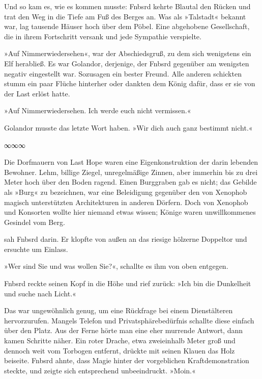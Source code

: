 Und so kam es, wie es kommen musste: Fnbsrd kehrte Blautal den Rücken und trat den Weg in die Tiefe am Fuß des Berges an. Was als »Talstadt« bekannt war, lag tausende Häuser hoch über dem Pöbel. Eine abgehobene Gesellschaft, die in ihrem Fortschritt versank und jede Sympathie verspielte.

»Auf Nimmerwiedersehen«, war der Abschiedsgruß, zu dem sich wenigstens ein Elf herabließ. Es war Golandor, derjenige, der Fnbsrd gegenüber am wenigsten negativ eingestellt war. Sozusagen ein bester Freund. Alle anderen schickten stumm ein paar Flüche hinterher oder dankten dem König dafür, dass er sie von der Last erlöst hatte.

»Auf Nimmerwiedersehen. Ich werde euch nicht vermissen.«

Golandor musste das letzte Wort haben. »Wir dich auch ganz bestimmt nicht.«

\begin{center}
∞∞∞
\end{center}

Die Dorfmauern von Last Hope waren eine Eigenkonstruktion der darin lebenden Bewohner. Lehm, billige Ziegel, unregelmäßige Zinnen, aber immerhin bis zu drei Meter hoch über den Boden ragend. Einen Burggraben gab es nicht; das Gebilde als »Burg« zu bezeichnen, war eine Beleidigung gegenüber den von Xenophob magisch unterstützten Architekturen in anderen Dörfern. Doch von Xenophob und Konsorten wollte hier niemand etwas wissen; Könige waren unwillkommenes Gesindel vom Berg.

 sah Fnbsrd darin. Er klopfte von außen an das riesige hölzerne Doppeltor und ersuchte um Einlass.

»Wer sind Sie und was wollen Sie?«, schallte es ihm von oben entgegen.

Fnbsrd reckte seinen Kopf in die Höhe und rief zurück: »Ich bin die Dunkelheit und suche nach Licht.«

Das war ungewöhnlich genug, um eine Rückfrage bei einem Dienstälteren hervorzurufen. Mangels Telefon und Privatsphärebedürfnis schallte diese einfach über den Platz. Aus der Ferne hörte man eine eher murrende Antwort, dann kamen Schritte näher. Ein roter Drache, etwa zweieinhalb Meter groß %
und dennoch weit vom Torbogen entfernt, drückte mit seinen Klauen das Holz beiseite. Fnbsrd ahnte, dass Magie hinter der vorgeblichen Kraftdemonstration steckte, und zeigte sich entsprechend unbeeindruckt. »Moin.«

